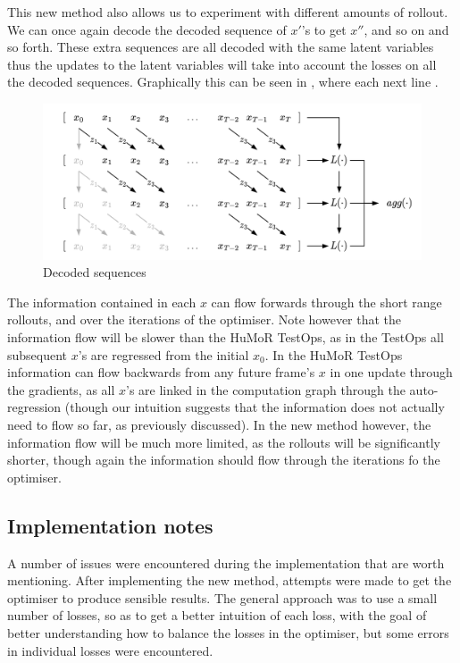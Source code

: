 This new method also allows us to experiment with different amounts of rollout. We can once again decode the decoded sequence of $x'$'s to get $x''$, and so on and so forth. These extra sequences are all decoded with the same latent variables thus the updates to the latent variables will take into account the losses on all the decoded sequences. Graphically this can be seen in , where each next line .

\begin{figure}[!ht]
    \centering
    \includegraphics[width=1\textwidth]{Figures/humor/improvement/Rollout_overlap.png}
    \caption{Decoded sequences}
    \label{fig:dimm_decoded_sequences}
\end{figure}

The information contained in each $x$ can flow forwards through the short range rollouts, and over the iterations of the optimiser. Note however that the information flow will be slower than the HuMoR TestOps, as in the TestOps all subsequent $x$'s are regressed from the initial $x_0$.
In the HuMoR TestOps information can flow backwards from any future frame's $x$ in one update through the gradients, as all $x$'s are linked in the computation graph through the auto-regression (though our intuition suggests that the information does not actually need to flow so far, as previously discussed). In the new method however, the information flow will be much more limited, as the rollouts will be significantly shorter, though again the information should flow through the iterations fo the optimiser.

\subsection{Implementation notes}

A number of issues were encountered during the implementation that are worth mentioning. After implementing the new method, attempts were made to get the optimiser to produce sensible results. The general approach was to use a small number of losses, so as to get a better intuition of each loss, with the goal of better understanding how to balance the losses in the optimiser, but some errors in individual losses were encountered.

